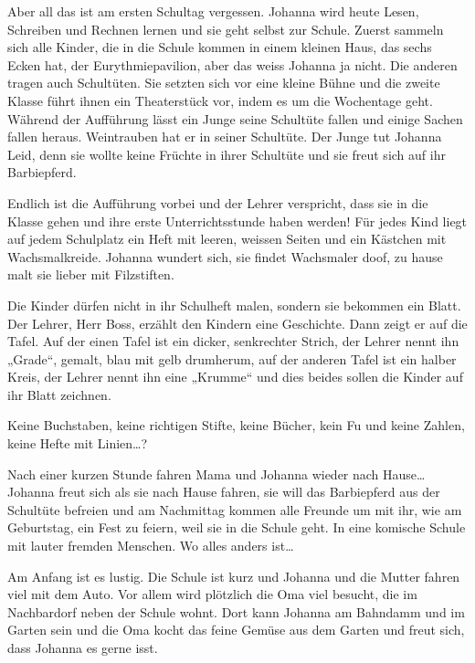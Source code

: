 \sterne

Aber all das ist am ersten Schultag vergessen. Johanna wird heute Lesen, Schreiben und Rechnen lernen und sie geht selbst zur Schule.
Zuerst sammeln sich alle Kinder, die in  die Schule kommen in einem kleinen Haus, das sechs Ecken hat, der Eurythmiepavilion, aber das weiss Johanna ja nicht. Die anderen tragen auch Schultüten. Sie setzten sich vor eine kleine Bühne und die zweite Klasse führt ihnen ein Theaterstück vor, indem es um die Wochentage geht. Während der Aufführung lässt ein Junge seine Schultüte fallen und einige Sachen fallen heraus. Weintrauben hat er in seiner Schultüte. Der Junge tut Johanna Leid, denn sie wollte keine Früchte in ihrer Schultüte und sie freut sich auf ihr Barbiepferd.

Endlich ist die Aufführung vorbei und der Lehrer verspricht, dass sie in die Klasse gehen und ihre erste Unterrichtsstunde haben werden! Für jedes Kind liegt auf jedem Schulplatz ein Heft mit leeren, weissen Seiten und ein Kästchen mit Wachsmalkreide. Johanna wundert sich, sie findet Wachsmaler doof, zu hause malt sie lieber mit Filzstiften. 

Die Kinder dürfen nicht in ihr Schulheft malen, sondern sie bekommen ein Blatt. Der Lehrer, Herr Boss, erzählt den Kindern eine Geschichte. Dann zeigt er auf die Tafel. Auf der einen Tafel ist ein dicker, senkrechter Strich, der Lehrer nennt ihn „Grade“, gemalt, blau mit gelb drumherum, auf der anderen Tafel ist ein halber Kreis, der Lehrer nennt ihn eine „Krumme“ und dies beides sollen die Kinder auf ihr Blatt zeichnen.

Keine Buchstaben, keine richtigen Stifte, keine Bücher, kein Fu und keine Zahlen, keine Hefte mit Linien\dots?

Nach einer kurzen Stunde fahren Mama und Johanna wieder nach Hause\dots
Johanna freut sich als sie nach Hause fahren, sie will das Barbiepferd aus der Schultüte befreien und am Nachmittag kommen alle Freunde um mit ihr, wie am Geburtstag, ein Fest zu feiern, weil sie in die Schule geht. In eine komische Schule mit lauter fremden Menschen. Wo alles anders ist\dots


\sterne


Am Anfang ist es lustig. Die Schule ist kurz und Johanna und die Mutter fahren viel mit dem Auto. Vor allem wird plötzlich die Oma viel besucht, die im Nachbardorf neben der Schule wohnt. Dort kann Johanna am Bahndamm und im Garten sein und die Oma kocht das feine Gemüse aus dem Garten und freut sich, dass Johanna es gerne isst.

